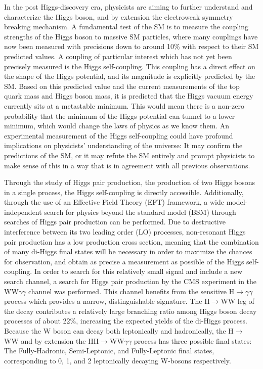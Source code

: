In the post Higgs-discovery era, physicists are aiming to further understand and characterize the Higgs boson, and by extension the electroweak symmetry breaking mechanism. A fundamental test of the SM is to measure the coupling strengths of the Higgs boson to massive SM particles, where many couplings have now been measured with precisions down to around 10\% with respect to their SM predicted values. A coupling of particular interest which has not yet been precisely measured is the Higgs self-coupling. This coupling has a direct effect on the shape of the Higgs potential, and its magnitude is explicitly predicted by the SM. Based on this predicted value and the current measurements of the top quark mass and Higgs boson mass, it is predicted that the Higgs vacuum energy currently sits at a metastable minimum. This would mean there is a non-zero probability that the minimum of the Higgs potential can tunnel to a lower minimum, which would change the laws of physics as we know them. An experimental measurement of the Higgs self-coupling could have profound implications on physicists' understanding of the universe: It may confirm the predictions of the SM, or it may refute the SM entirely and prompt physicists to make sense of this in a way that is in agreement with all previous observations. 

Through the study of Higgs pair production, the production of two Higgs bosons in a single process, the Higgs self-coupling is directly accessible. Additionally, through the use of an Effective Field Theory (EFT) framework, a wide model-independent search for physics beyond the standard model (BSM) through searches of Higgs pair production can be performed. Due to destructive interference between its two leading order (LO) processes, non-resonant Higgs pair production has a low production cross section, meaning that the combination of many di-Higgs final states will be necessary in order to maximize the chances for observation, and obtain as precise a measurement as possible of the Higgs self-coupling. In order to search for this relatively small signal and include a new search channel, a search for Higgs pair production by the CMS experiment in the WW$\gamma\gamma$ channel was performed. This channel benefits from the sensitive H$\rightarrow\gamma\gamma$ process which provides a narrow, distinguishable signature. The H$\rightarrow$WW leg of the decay contributes a relatively large branching ratio among Higgs boson decay processes of about 22\%, increasing the expected yields of the di-Higgs process. Because the W boson can decay both leptonically and hadronically, the H$\rightarrow$WW and by extension the HH$\rightarrow$WW$\gamma\gamma$ process has three possible final states: The Fully-Hadronic, Semi-Leptonic, and Fully-Leptonic final states, corresponding to 0, 1, and 2 leptonically decaying W-bosons respectively.

